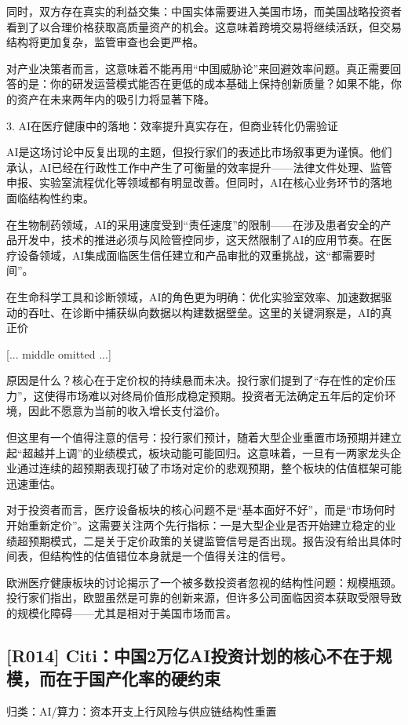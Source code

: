 \documentclass[11pt]{ctexart}
\begin{document}
同时，双方存在真实的利益交集：中国实体需要进入美国市场，而美国战略投资者看到了以合理价格获取高质量资产的机会。这意味着跨境交易将继续活跃，但交易结构将更加复杂，监管审查也会更严格。

对产业决策者而言，这意味着不能再用“中国威胁论”来回避效率问题。真正需要回答的是：你的研发运营模式能否在更低的成本基础上保持创新质量？如果不能，你的资产在未来两年内的吸引力将显著下降。

3. AI在医疗健康中的落地：效率提升真实存在，但商业转化仍需验证

AI是这场讨论中反复出现的主题，但投行家们的表述比市场叙事更为谨慎。他们承认，AI已经在行政性工作中产生了可衡量的效率提升——法律文件处理、监管申报、实验室流程优化等领域都有明显改善。但同时，AI在核心业务环节的落地面临结构性约束。

在生物制药领域，AI的采用速度受到“责任速度”的限制——在涉及患者安全的产品开发中，技术的推进必须与风险管控同步，这天然限制了AI的应用节奏。在医疗设备领域，AI集成面临医生信任建立和产品审批的双重挑战，这“都需要时间”。

在生命科学工具和诊断领域，AI的角色更为明确：优化实验室效率、加速数据驱动的吞吐、在诊断中捕获纵向数据以构建数据壁垒。这里的关键洞察是，AI的真正价

[... middle omitted ...]

原因是什么？核心在于定价权的持续悬而未决。投行家们提到了“存在性的定价压力”，这使得市场难以对终局价值形成稳定预期。投资者无法确定五年后的定价环境，因此不愿意为当前的收入增长支付溢价。

但这里有一个值得注意的信号：投行家们预计，随着大型企业重置市场预期并建立起“超越并上调”的业绩模式，板块动能可能回归。这意味着，一旦有一两家龙头企业通过连续的超预期表现打破了市场对定价的悲观预期，整个板块的估值框架可能迅速重估。

对于投资者而言，医疗设备板块的核心问题不是“基本面好不好”，而是“市场何时开始重新定价”。这需要关注两个先行指标：一是大型企业是否开始建立稳定的业绩超预期模式，二是关于定价政策的关键监管信号是否出现。报告没有给出具体时间表，但结构性的估值错位本身就是一个值得关注的信号。

欧洲医疗健康板块的讨论揭示了一个被多数投资者忽视的结构性问题：规模瓶颈。投行家们指出，欧盟虽然是可靠的创新来源，但许多公司面临因资本获取受限导致的规模化障碍——尤其是相对于美国市场而言。

\subsection{[R014] Citi：中国2万亿AI投资计划的核心不在于规模，而在于国产化率的硬约束}
{\small\color{refgray}归类：AI/算力：资本开支上行风险与供应链结构性重置}
\end{document}
